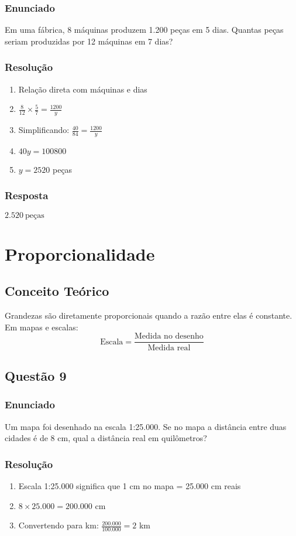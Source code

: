 \documentclass[11pt]{article}
\begin{document}
\subsubsection*{Enunciado}
Em uma fábrica, 8 máquinas produzem 1.200 peças em 5 dias. Quantas peças seriam produzidas por 12 máquinas em 7 dias?

\subsubsection*{Resolução}
\begin{enumerate}
\item Relação direta com máquinas e dias
\item $\frac{8}{12} \times \frac{5}{7} = \frac{1200}{y}$
\item Simplificando: $\frac{40}{84} = \frac{1200}{y}$
\item $40y = 100800$
\item $y = 2520$ peças
\end{enumerate}

\subsubsection*{Resposta}
$\boxed{2.520\ \text{peças}}$

\section{Proporcionalidade}

\subsection{Conceito Teórico}
Grandezas são diretamente proporcionais quando a razão entre elas é constante. Em mapas e escalas:
\[ \text{Escala} = \frac{\text{Medida no desenho}}{\text{Medida real}} \]

\subsection{Questão 9}
\subsubsection*{Enunciado}
Um mapa foi desenhado na escala 1:25.000. Se no mapa a distância entre duas cidades é de 8 cm, qual a distância real em quilômetros?

\subsubsection*{Resolução}
\begin{enumerate}
\item Escala 1:25.000 significa que 1 cm no mapa = 25.000 cm reais
\item $8 \times 25.000 = 200.000$ cm
\item Convertendo para km: $\frac{200.000}{100.000} = 2$ km
\end{enumerate}
\end{document}
